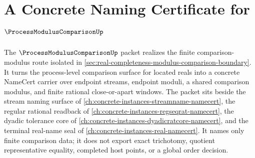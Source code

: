 \chapter{A Concrete Naming Certificate for $\ProcessModulusComparisonUp$}
\label{ch:concrete-instances-process-modulus-comparison-namecert}

The $\ProcessModulusComparisonUp$ packet realizes the finite comparison-modulus route isolated in \autoref{sec:real-completeness-modulus-comparison-boundary}. It turns the process-level comparison surface for located reals into a concrete NameCert carrier over endpoint streams, endpoint moduli, a shared comparison modulus, and finite rational close-or-apart windows. The packet sits beside the stream naming surface of \autoref{ch:concrete-instances-streamname-namecert}, the regular rational readback of \autoref{ch:concrete-instances-regseqrat-namecert}, the dyadic tolerance core of \autoref{ch:concrete-instances-dyadicratcore-namecert}, and the terminal real-name seal of \autoref{ch:concrete-instances-real-namecert}. It names only finite comparison data; it does not export exact trichotomy, quotient representative equality, completed host points, or a global order decision.


